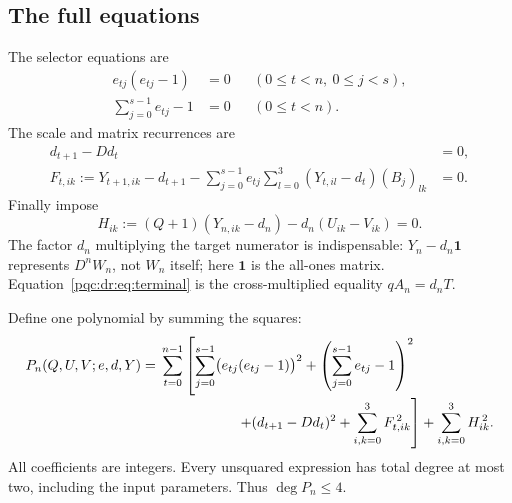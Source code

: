 \documentclass[11pt,letterpaper]{article}
\numberwithin{equation}{section}
\theoremstyle{definition}
\theoremstyle{remark}
\begin{document}
\subsection{The full equations}
The selector equations are
\begin{align}
 e_{tj}(e_{tj}-1)&=0 &&(0\leq t<n,\ 0\leq j<s),\label{pqc:dr:eq:boolean}\\
 \sum_{j=0}^{s-1}e_{tj}-1&=0 &&(0\leq t<n).\label{pqc:dr:eq:onehot}
\end{align}
The scale and matrix recurrences are
\begin{align}
 d_{t+1}-Dd_t&=0,\label{pqc:dr:eq:scale}\\
 F_{t,ik}:=Y_{t+1,ik}-d_{t+1}
 -\sum_{j=0}^{s-1}e_{tj}\sum_{l=0}^3
 (Y_{t,il}-d_t)(B_j)_{lk}&=0.
 \label{pqc:dr:eq:matrixrec}
\end{align}
Finally impose
\begin{equation}
 H_{ik}:=(Q+1)(Y_{n,ik}-d_n)-d_n(U_{ik}-V_{ik})=0.
 \label{pqc:dr:eq:terminal}
\end{equation}
The factor $d_n$ multiplying the target numerator is indispensable:
$Y_n-d_n\mathbf1$ represents $D^nW_n$, not $W_n$ itself; here $\mathbf1$ is the all-ones matrix.
Equation~\eqref{pqc:dr:eq:terminal} is the cross-multiplied equality
$qA_n=d_nT$.

Define one polynomial by summing the squares:
\begin{equation}
\begin{split}
 P_n(Q,U,V;e,d,Y)={}&
 \sum_{t=0}^{n-1}\left[
   \sum_{j=0}^{s-1}\bigl(e_{tj}(e_{tj}-1)\bigr)^2
   +\left(\sum_{j=0}^{s-1}e_{tj}-1\right)^2\right.\\[-2pt]
 &\hspace{5.5em}\left. +(d_{t+1}-Dd_t)^2
   +\sum_{i,k=0}^3F_{t,ik}^{\,2}\right]
   +\sum_{i,k=0}^3H_{ik}^{\,2}.
\end{split}
\label{pqc:dr:eq:quartic}
\end{equation}
All coefficients are integers. Every unsquared expression has total
degree at most two, including the input parameters. Thus
$\deg P_n\leq4$.
\end{document}
